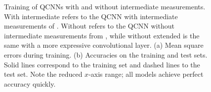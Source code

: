 \begin{figure}
\begin{subfigure}{0.49\textwidth}
        \caption{}
        \label{fig:qcnnm_acc}
    \end{subfigure}
    \caption{
        Training of QCNNs with and without intermediate measurements.
        With intermediate refers to the QCNN with intermediate measurements of \cite{pesah2021}.
        Without refers to the QCNN without intermediate measurements from , while without extended is the same with a more expressive convolutional layer.
        (a) Mean square errors during training.
        (b) Accuracies on the training and test sets.
        Solid lines correspond to the training set and dashed lines to the test set.
        Note the reduced $x$-axis range; all models achieve perfect accuracy quickly.
    }
    \label{fig:qcnnm_training}
\end{figure}